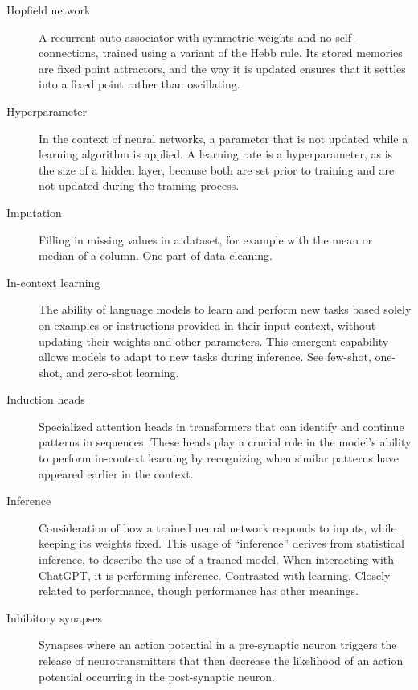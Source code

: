 \begin{description}
\item[Hopfield network] A recurrent auto-associator with symmetric weights and no self-connections, trained using a variant of the Hebb rule. Its stored memories are fixed point attractors, and the way it is updated ensures that it settles into a fixed point rather than oscillating.

\item[Hyperparameter] In the context of neural networks, a parameter that is not updated while a learning algorithm is applied. A learning rate is a hyperparameter, as is the size of a hidden layer, because both are set prior to training and are not updated during the training process.


\item[Imputation] Filling in missing values in a dataset, for example with the mean or median of a column. One part of data cleaning.

\item[In-context learning] The ability of language models to learn and perform new tasks based solely on examples or instructions provided in their input context, without updating their weights and other parameters. This emergent capability allows models to adapt to new tasks during inference. See few-shot, one-shot, and zero-shot learning.

\item[Induction heads] Specialized attention heads in transformers that can identify and continue patterns in sequences. These heads play a crucial role in the model's ability to perform in-context learning by recognizing when similar patterns have appeared earlier in the context.

\item[Inference] Consideration of how a trained neural network responds to inputs, while keeping its weights fixed. This usage of ``inference'' derives from statistical inference, to describe the use of a trained model. When interacting with ChatGPT, it is performing inference. Contrasted with learning.  Closely related to performance, though performance has other meanings.

\item[Inhibitory synapses] Synapses where an action potential in a pre-synaptic neuron triggers the release of neurotransmitters that then decrease the likelihood of an action potential occurring in the post-synaptic neuron.


\end{description}
